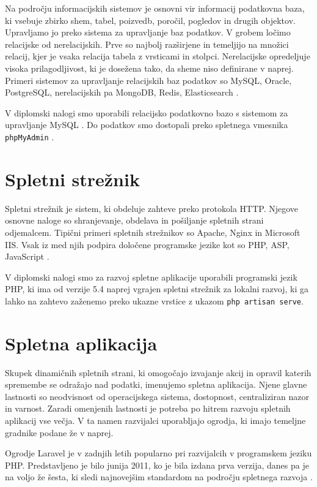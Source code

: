 \documentclass[a4paper, 12pt]{book}
\begin{document}
Na področju informacijskih sistemov je osnovni vir informacij podatkovna baza, ki vsebuje zbirko shem, tabel, poizvedb, poročil, pogledov in drugih objektov. Upravljamo jo preko sistema za upravljanje baz podatkov. V grobem ločimo relacijske od nerelacijskih. Prve so najbolj razširjene in temeljijo na množici relacij, kjer je vsaka relacija tabela z vrsticami in stolpci. Nerelacijske opredeljuje visoka prilagodljivost, ki je dosežena tako, da sheme niso definirane v naprej.
Primeri sistemov za upravljanje relacijskih baz podatkov so MySQL, Oracle, PostgreSQL, nerelacijskih pa MongoDB, Redis, Elasticsearch \cite{podatkovne-baze}.

V diplomski nalogi smo uporabili relacijsko podatkovno bazo s sistemom za upravljanje MySQL \cite{mysql-baza}. Do podatkov smo dostopali preko spletnega vmesnika \verb=phpMyAdmin= \cite{phpmyadmin-framework}.

\section{Spletni strežnik}

Spletni strežnik je sistem, ki obdeluje zahteve preko protokola HTTP.
Njegove osnovne naloge so shranjevanje, obdelava in pošiljanje spletnih strani odjemalcem. Tipični primeri spletnih strežnikov so Apache, Nginx in Microsoft IIS. Vsak iz med njih podpira določene programske jezike kot so PHP, ASP, JavaScript \cite{spletni-strezniki}.

V diplomski nalogi smo za razvoj spletne aplikacije uporabili programski jezik PHP, ki ima od verzije 5.4 naprej vgrajen spletni strežnik za lokalni razvoj, ki ga lahko na zahtevo zaženemo preko ukazne vrstice z ukazom \verb=php artisan serve=.

\section{Spletna aplikacija}

Skupek dinamičnih spletnih strani, ki omogočajo izvajanje akcij in opravil katerih spremembe se odražajo nad podatki, imenujemo spletna aplikacija. Njene glavne lastnosti so neodvisnost od operacijskega sistema, dostopnost, centraliziran nazor in varnost. Zaradi omenjenih lastnosti je potreba po hitrem razvoju spletnih aplikacij vse večja. V ta namen razvijalci uporabljajo ogrodja, ki imajo temeljne gradnike podane že v naprej.

Ogrodje Laravel je v zadnjih letih popularno pri razvijalcih v programskem jeziku PHP. Predstavljeno je bilo junija 2011, ko je bila izdana prva verzija, danes pa je na voljo že šesta, ki sledi najnovejšim standardom na področju spletnega razvoja \cite{laravel-main-page}. 
\end{document}
